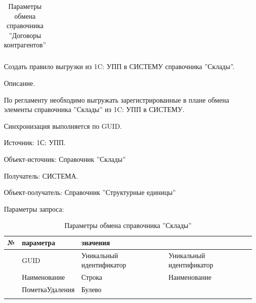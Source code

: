 \begin{longtable}{|p{10mm}|p{35mm}|p{40mm}|p{60mm}|}
\caption{Параметры обмена справочника ''Договоры контрагентов''}\label{ex:contract}
\end{longtable}  
\normalsize




Создать правило выгрузки из 1C: УПП в СИСТЕМУ справочника ''Склады''.


Описание.

По регламенту необходимо выгружать зарегистрированные в плане обмена элементы справочника ''Склады'' из  1C: УПП в СИСТЕМУ.

Синхронизация выполняется по GUID.

Источник: 1С: УПП.

Объект-источник: Справочник ''Склады'' 

Получатель: СИСТЕМА.

Объект-получатель: Справочник ''Структурные единицы''

Параметры запроса:
\pc
\scriptsize
\begin{longtable}{|p{10mm}|p{35mm}|p{40mm}|p{60mm}|}
\hline
\parbox[c][5mm]{10mm}{\centering№} & \parbox[c]{35mm}{ параметра} & \parbox[c]{40mm}{ значения} & \parbox[c]{60mm}{} \\
\hline
\parbox[c][5mm]{16mm}{\p} & GUID & Уникальный идентификатор & Уникальный идентификатор \\
\hline
\parbox[c][5mm]{16mm}{\p} & Наименование &     Строка & Наименование \\
\hline
\parbox[c][5mm]{16mm}{\p} & ПометкаУдаления & Булево & \\
\hline

\caption{Параметры обмена справочника ''Склады''}\label{ex:contract}
\end{longtable}  
\normalsize




